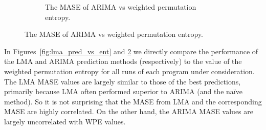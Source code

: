 \documentclass{article}
\begin{document}
\begin{figure}[htbp]
\begin{subfigure}{\textwidth}
    \caption{The MASE of ARIMA vs weighted permutation entropy. }
    \label{fig:arima_pred_vs_ent}
  \end{subfigure}

\end{figure} 
In Figures~\ref{fig:lma_pred_vs_ent} and \ref{fig:arima_pred_vs_ent} we directly
compare the performance of the LMA and ARIMA prediction methods (respectively)
to the value of the weighted permutation entropy for all runs of each program
under consideration. The LMA MASE values are largely similar to those of the
best predictions, primarily because LMA often performed superior to ARIMA (and
the na\"ive method). So it is not surprising that the MASE from LMA and the corresponding MASE are highly correlated. On the other hand, the ARIMA MASE values are largely
uncorrelated with WPE values. 
\end{document}
